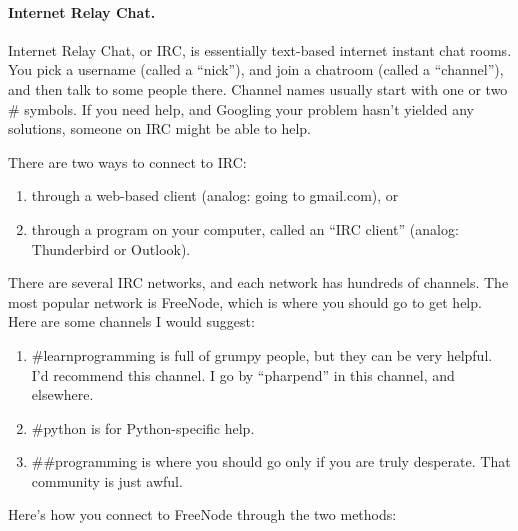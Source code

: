 \paragraph{Internet Relay Chat.}

Internet Relay Chat, or IRC, is essentially text-based internet
instant chat rooms. You pick a username (called a ``nick''), and join
a chatroom (called a ``channel''), and then talk to some people
there. Channel names usually start with one or two \# symbols. If you
need help, and Googling your problem hasn't yielded any solutions,
someone on IRC might be able to help.

There are two ways to connect to IRC:

\begin{enumerate}
\item through a web-based client (analog: going to gmail.com), or
\item through a program on your computer, called an ``IRC client''
  (analog: Thunderbird or Outlook).
\end{enumerate}

There are several IRC networks, and each network has hundreds of
channels. The most popular network is FreeNode, which is where you
should go to get help. Here are some channels I would suggest:

\begin{enumerate}
\item \#learnprogramming is full of grumpy people, but they can be
  very helpful. I'd recommend this channel. I go by ``pharpend'' in
  this channel, and elsewhere.
\item \#python is for Python-specific help.
\item \#\#programming is where you should go only if you are truly
  desperate. That community is just awful.
\end{enumerate}

Here's how you connect to FreeNode through the two methods:

